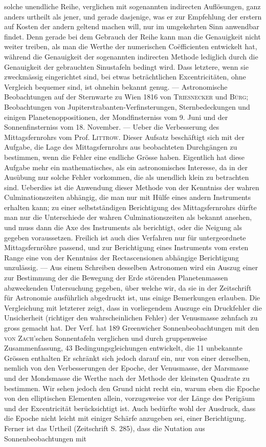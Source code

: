 solche unendliche Reihe, verglichen mit sogenannten indirecten Auflösungen, ganz anders urtheilt als jener, und gerade dasjenige, was er zur Empfehlung der erstern auf Kosten der andern geltend machen will, nur im umgekehrten Sinn anwendbar findet. Denn gerade bei dem Gebrauch der Reihe kann man die Genauigkeit nicht weiter treiben, als man die Werthe der numerischen Coëfficienten entwickelt hat, während die Genauigkeit der sogenannten indirecten Methode lediglich durch die Genauigkeit der gebrauchten Sinustafeln bedingt wird. Dass letztere, wenn sie zweckmässig eingerichtet sind, bei etwas beträchtlichen Excentricitäten, ohne Vergleich bequemer sind, ist ohnehin bekannt genug. --- Astronomische Beobachtungen auf der Sternwarte zu Wien 1816 von \textsc{Triesnecker} und \textsc{Bürg}; Beobachtungen von Jupiterstrabanten-Verfinsterungen, Sternbedeckungen und einigen Planetenoppositionen, der Mondfinsterniss vom 9. Juni und der Sonnenfinsterniss vom 18. November. --- Ueber die Verbesserung des Mittagsfernrohrs vom Prof. \textsc{Littrow}. Dieser Aufsatz beschäftigt sich mit der Aufgabe, die Lage des Mittagsfernrohrs aus beobachteten Durchgängen zu bestimmen, wenn die Fehler eine endliche Grösse haben. Eigentlich hat diese Aufgabe mehr ein mathematisches, als ein astronomisches Interesse, da in der Ausübung nur solche Fehler vorkommen, die als unendlich klein zu betrachten sind. Ueberdies ist die Anwendung dieser Methode von der Kenntniss der wahren Culminationszeiten abhängig, die man nur mit Hülfe eines andern Instruments erhalten kann; zu einer selbstständigen Berichtigung des Mittagsfernrohrs dürfte man nur die Unterschiede der wahren Culminationszeiten als bekannt ansehen, und muss dann die Axe des Instruments als berichtigt, oder die Neigung als gegeben voraussetzen. Freilich ist auch dies Verfahren nur für untergeordnete Mittagsfernröhre passend, und zur Berichtigung eines Instruments vom ersten Range eine von der Kenntniss der Rectascensionen abhängige Berichtigung unzulässig. --- Aus einem Schreiben desselben Astronomen wird ein Auszug einer zur Bestimmung der die Bewegung der Erde störenden Planetenmassen abzweckenden Untersuchung gegeben, über welche wir, da sie in der Zeitschrift für Astronomie ausführlich abgedruckt ist, uns einige Bemerkungen erlauben. Die Vergleichung mit letzterer zeigt, dass in vorliegendem Auszuge ein Druckfehler die Unsicherheit (richtiger den wahrscheinlichen Fehler) der Venusmasse zehnfach zu gross gemacht hat. Der Verf. hat 189 Greenwicher Sonnenbeobachtungen mit den \textsc{von Zach}'schen Sonnentafeln verglichen und durch gruppenweise Zusammenfassung, 43 Bedingungsgleichungen entwickelt, die 11 unbekannte Grössen enthalten Er schränkt sich jedoch darauf ein, nur von einer derselben, nemlich von den Verbesserungen der Epoche, der Venusmasse, der Marsmasse und der Mondsmasse die Werthe nach der Methode der kleinsten Quadrate zu bestimmen. Wir sehen jedoch den Grund nicht recht ein, warum eben die Epoche von den elliptischen Elementen allein, vorzugsweise vor der Länge des Perigäum und der Excentricität berücksichtigt ist. Auch bedürfte wohl der Ausdruck, dass die Epoche nicht leicht mit einiger Schärfe anzugeben sei, einer Berichtigung. Ferner ist das Urtheil (Zeitschrift S. 285), dass die Nutation aus Sonnenbeobachtungen mit 